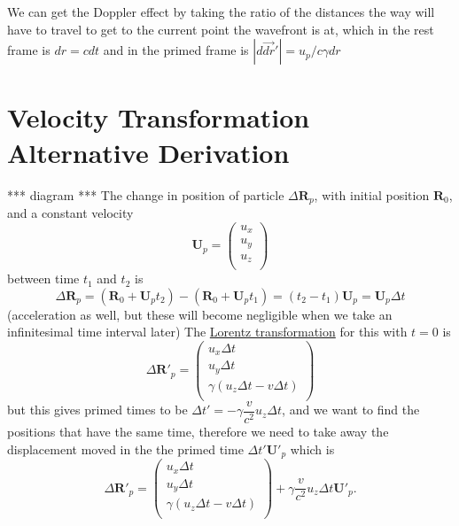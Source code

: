 We can get the Doppler effect by taking the ratio of the distances the way will have to travel to get to the current point the wavefront is at, which in the rest frame is $dr=cdt$ and in the primed frame is $|d\vec{dr}'| = u_p/c \gamma dr$

\chapter{Velocity Transformation Alternative Derivation}
*** diagram *** \newline
The change in position of particle $\Delta \mathbf{R}_p$, with initial position $\mathbf{R}_0$, and a constant velocity
\begin{equation}%
    \mathbf{U}_p = \begin{pmatrix}
        u_x \\ u_y \\ u_z \\
    \end{pmatrix}
\end{equation}%
between time $t_1$ and $t_2$ is
\begin{equation}%
    \Delta \mathbf{R}_p = (\mathbf{R}_0 +\mathbf{U}_p t_2) - (\mathbf{R}_0 +\mathbf{U}_p t_1) =  (t_2 - t_1) \mathbf{U}_p =  \mathbf{U}_p \Delta t
\end{equation}%
(acceleration as well, but these will become negligible when we take an infinitesimal time interval later)
The \hyperlink{def-lorentz-transform}{Lorentz transformation} for this with $t=0$ is
\begin{equation}%
    \Delta \mathbf{R}'_p = \begin{pmatrix}
        u_x \Delta t \\ u_y \Delta t \\ \gamma \left( u_z \Delta t - v \Delta t \right) \\
    \end{pmatrix}
\end{equation}%
but this gives primed times to be $\Delta t'=-\gamma\dfrac{v}{c^2} u_z \Delta t$, and we want to find the positions that have the same time, therefore we need to take away the displacement moved in the the primed time $\Delta t' \mathbf{U'}_p $ which is
\begin{equation}%
    \Delta \mathbf{R}'_p = \begin{pmatrix}
        u_x \Delta t \\ u_y \Delta t \\ \gamma \left( u_z \Delta t - v \Delta t \right) \\
    \end{pmatrix} + \gamma\dfrac{v}{c^2} u_z \Delta t  \mathbf{U'}_p.
\end{equation}%
